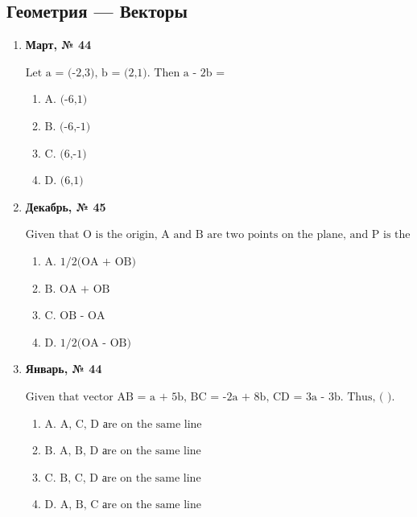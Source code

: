 \subsection*{Геометрия — Векторы}
\begin{enumerate}
\item \textbf{Март, № 44} \par \smallskip
$\displaystyle \text{Let a = (-2,3), b = (2,1). Then a - 2b =}$
\begin{enumerate}
\item $\displaystyle \text{A. (-6,1)}$
\item $\displaystyle \text{B. (-6,-1)}$
\item $\displaystyle \text{C. (6,-1)}$
\item $\displaystyle \text{D. (6,1)}$
\end{enumerate}
\item \textbf{Декабрь, № 45} \par \smallskip
$\displaystyle \text{Given that O is the origin, A and B are two points on the plane, and P is the midpoint of AB, then the vector OP=}$
\begin{enumerate}
\item $\displaystyle \text{A. 1/2(OA + OB)}$
\item $\displaystyle \text{B. OA + OB}$
\item $\displaystyle \text{C. OB - OA}$
\item $\displaystyle \text{D. 1/2(OA - OB)}$
\end{enumerate}
\item \textbf{Январь, № 44} \par \smallskip
$\displaystyle \text{Given that vector AB = a + 5b, BC = -2a + 8b, CD = 3a - 3b. Thus, ( ).}$
\begin{enumerate}
\item $\displaystyle \text{A. A, C, D  аre on the same line}$
\item $\displaystyle \text{B. A, B, D  аre on the same line}$
\item $\displaystyle \text{C. B, C, D  аre on the same line}$
\item $\displaystyle \text{D. A, B, C  аre on the same line}$
\end{enumerate}
\end{enumerate}

